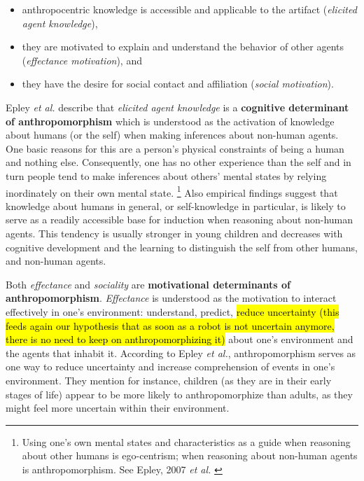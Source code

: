 \documentclass[lettersize, apacite, twoside, HRI]{apa_HRI}
\begin{document}
\begin{itemize}
	\item anthropocentric knowledge is accessible and applicable to the artifact (\textit{elicited agent knowledge}),
	\item they are motivated to explain and understand the behavior of other agents (\textit{effectance motivation}), and
	\item they have the desire for social contact and affiliation (\textit{social motivation}).
\end{itemize}

	Epley \textit{et al.} describe that \textit{elicited agent knowledge} is a \textbf{cognitive determinant  of anthropomorphism} which is understood as the activation of knowledge about humans (or the self) when making inferences about non-human agents. One basic reasons for this are a person's physical constraints of being a human and nothing else. Consequently, one has no other experience than the self and in turn people tend to make inferences about others' mental states by relying inordinately on their own mental state. \footnote{Using one's own mental states and characteristics as a guide when reasoning about other humans is ego-centrism; when reasoning about non-human agents is anthropomorphism. See Epley, 2007 \textit{et al.} \cite{epley_seeing_2007}} Also empirical findings suggest that knowledge about humans in general, or self-knowledge in particular, is likely to serve as a readily accessible base for induction when reasoning about non-human agents. This tendency is usually stronger in young children and decreases with cognitive development and the learning to distinguish the self from other humans, and non-human agents. 
	
    Both \textit{effectance} and \textit{sociality} are \textbf{motivational determinants of anthropomorphism}. \textit{Effectance} is understood as the motivation to interact effectively in one's environment: understand, predict, \hl{reduce uncertainty (this feeds again our hypothesis that as soon as a robot is not uncertain anymore, there is no need to keep on anthropomorphizing it)} about one's environment and the agents that inhabit it. According to Epley \textit{et al.}, anthropomorphism serves as one way to reduce uncertainty and increase comprehension of events in one's environment. They mention for instance, children (as they are in their early stages of life) appear to be more likely to anthropomorphize than adults, as they might feel more uncertain within their environment.
\end{document}
